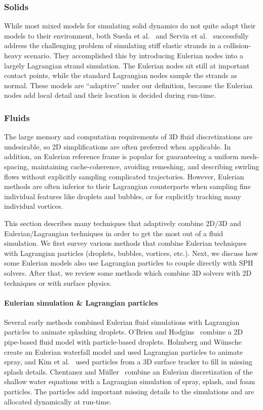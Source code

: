 \subsubsection{Solids}
While most mixed models for simulating solid dynamics do not quite adapt their models to their environment, both Sueda et al.~\cite{Sueda2011} and Servin et al.~\cite{Servin2011} successfully address the challenging problem of simulating stiff elastic strands in a collision-heavy scenario. They accomplished this by introducing Eulerian nodes into a largely Lagrangian strand simulation. The Eulerian nodes sit still at important contact points, while the standard Lagrangian nodes sample the strands as normal. These models are ``adaptive'' under our definition, because the Eulerian nodes add local detail and their location is decided during run-time.


\subsubsection{Fluids}
The large memory and computation requirements of 3D fluid discretizations are undesirable, so 2D simplifications are often preferred when applicable. In addition, an Eulerian reference frame is popular for guaranteeing a uniform mesh-spacing, maintaining cache-coherence, avoiding remeshing, and describing swirling flows without explicitly sampling complicated trajectories. However, Eulerian methods are often inferior to their Lagrangian counterparts when sampling fine individual features like droplets and bubbles, or for explicitly tracking many individual vortices.

This section describes many techniques that adaptively combine 2D/3D and Eulerian/Lagrangian techniques in order to get the most out of a fluid simulation. We first survey various methods that combine Eulerian techniques with Lagrangian particles (droplets, bubbles, vortices, etc.). Next, we discuss how some Eulerian models also use Lagrangian particles to couple directly with SPH solvers. After that, we review some methods which combine 3D solvers with 2D techniques or with surface physics.

\paragraph*{Eulerian simulation \& Lagrangian particles}

Several early methods combined Eulerian fluid simulations with Lagrangian particles to animate splashing droplets. O'Brien and Hodgins~\cite{OBrien1995} combine a 2D pipe-based fluid model with particle-based droplets. Holmberg and W\"unsche~\cite{Holmberg2004} create an Eulerian waterfall model and used Lagrangian particles to animate spray, and Kim et al.~\cite{Kim2006:Splash} used particles from a 3D surface tracker to fill in missing splash details. Chentanez and M\"uller~\cite{Chentanez2010} combine an Eulerian discretization of the shallow water equations with a Lagrangian simulation of spray, splash, and foam particles. The particles add important missing details to the simulations and are allocated dynamically at run-time.

